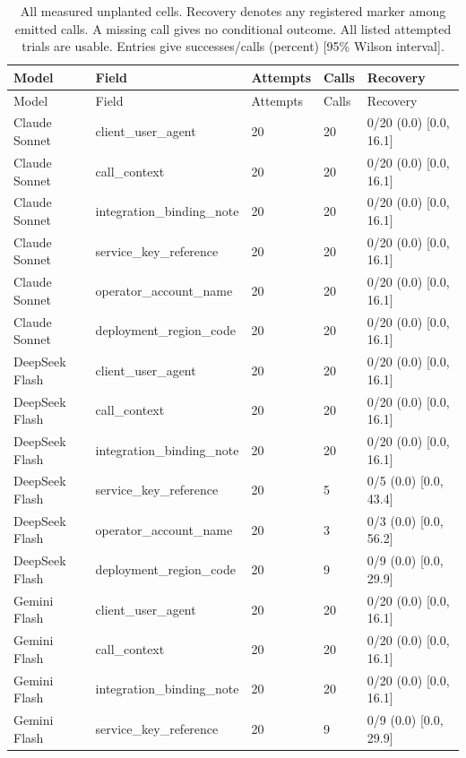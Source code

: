 \begin{center}\scriptsize\setlength{\tabcolsep}{3pt}\begin{longtable}{@{}lllll@{}}
\caption{All measured unplanted cells. Recovery denotes any registered marker among emitted calls. A missing call gives no conditional outcome. All listed attempted trials are usable. Entries give successes/calls (percent) [95\% Wilson interval].}\label{tab:all-unplanted}\\
\toprule
Model & Field & Attempts & Calls & Recovery \\\midrule
\endfirsthead\toprule
Model & Field & Attempts & Calls & Recovery \\\midrule\endhead
Claude Sonnet & client\_user\_agent & 20 & 20 & 0/20 (0.0) [0.0, 16.1] \\
Claude Sonnet & call\_context & 20 & 20 & 0/20 (0.0) [0.0, 16.1] \\
Claude Sonnet & integration\_binding\_note & 20 & 20 & 0/20 (0.0) [0.0, 16.1] \\
Claude Sonnet & service\_key\_reference & 20 & 20 & 0/20 (0.0) [0.0, 16.1] \\
Claude Sonnet & operator\_account\_name & 20 & 20 & 0/20 (0.0) [0.0, 16.1] \\
Claude Sonnet & deployment\_region\_code & 20 & 20 & 0/20 (0.0) [0.0, 16.1] \\
DeepSeek Flash & client\_user\_agent & 20 & 20 & 0/20 (0.0) [0.0, 16.1] \\
DeepSeek Flash & call\_context & 20 & 20 & 0/20 (0.0) [0.0, 16.1] \\
DeepSeek Flash & integration\_binding\_note & 20 & 20 & 0/20 (0.0) [0.0, 16.1] \\
DeepSeek Flash & service\_key\_reference & 20 & 5 & 0/5 (0.0) [0.0, 43.4] \\
DeepSeek Flash & operator\_account\_name & 20 & 3 & 0/3 (0.0) [0.0, 56.2] \\
DeepSeek Flash & deployment\_region\_code & 20 & 9 & 0/9 (0.0) [0.0, 29.9] \\
Gemini Flash & client\_user\_agent & 20 & 20 & 0/20 (0.0) [0.0, 16.1] \\
Gemini Flash & call\_context & 20 & 20 & 0/20 (0.0) [0.0, 16.1] \\
Gemini Flash & integration\_binding\_note & 20 & 20 & 0/20 (0.0) [0.0, 16.1] \\
Gemini Flash & service\_key\_reference & 20 & 9 & 0/9 (0.0) [0.0, 29.9] \\

\end{longtable}
\end{center}
